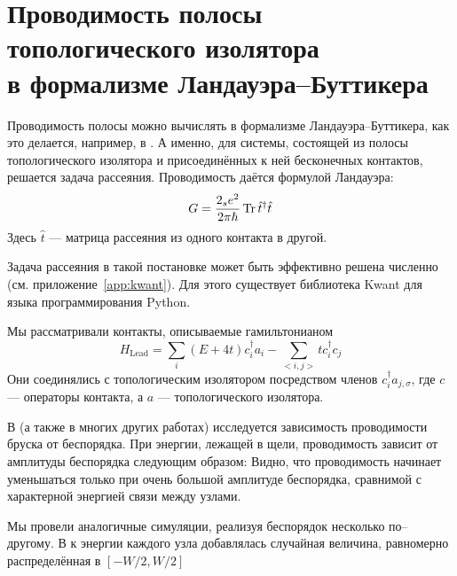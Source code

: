 \section{Проводимость полосы топологического изолятора\\
         в формализме Ландауэра--Буттикера}
Проводимость полосы можно вычислять в формализме Ландауэра--Буттикера, как
это делается, например, в \cite{Li2009}. А именно, для системы, состоящей
из полосы топологического изолятора и присоединённых к ней бесконечных
контактов, решается задача рассеяния. Проводимость даётся формулой
Ландауэра:
\begin{equation}
    G = \frac{2_se^2}{2\pi \hbar} \operatorname{Tr}{\hat{t}^\dagger \hat{t}}
\end{equation}
Здесь $\hat{t}$ --- матрица рассеяния из одного контакта в другой. 

Задача рассеяния в такой постановке может быть эффективно решена численно
(см. приложение~\ref{app:kwant}). Для этого существует библиотека Kwant 
\cite{Groth2014} для языка программирования Python.

Мы рассматривали контакты, описываемые гамильтонианом
\begin{equation}
    H_{\mathrm{Lead}} = \sum_i (E + 4t)c_{i}^\dagger a_{i} - \sum_{<i,j>} t c_{i}^\dagger c_{j}
\end{equation}
Они соединялись с топологическим изолятором посредством членов $c_i^\dagger a_{j,\sigma}$, 
где $c$ --- операторы контакта, а $a$ --- топологического изолятора.

В \cite{Li2009} (а также в многих других работах) исследуется зависимость проводимости 
бруска от беспорядка. При энергии, лежащей в щели, проводимость зависит от амплитуды
беспорядка следующим образом:
Видно, что проводимость начинает уменьшаться только при очень большой амплитуде беспорядка,
сравнимой с характерной энергией связи между узлами.

Мы провели аналогичные симуляции, реализуя беспорядок несколько по--другому. В \cite{Li2009}
к энергии каждого узла добавлялась случайная величина, равномерно распределённая в 
$[-W/2, W/2]$
